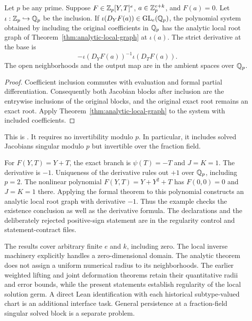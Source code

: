 \begin{corollary}
\label{cor:integral-analytic-graph}
Let $p$ be any prime. Suppose $F\in\mathbb Z_p[Y,T]^e$, $a\in\mathbb Z_p^{e+k}$,
and $F(a)=0$. Let $\iota:\mathbb Z_p\hookrightarrow\mathbb Q_p$ be the inclusion.
If $\iota(D_YF(a))\in\operatorname{GL}_e(\mathbb Q_p)$, the polynomial system
obtained by including the original coefficients in $\mathbb Q_p$ has the analytic
local root graph of Theorem~\ref{thm:analytic-local-graph} at $\iota(a)$.
The strict derivative at the base is
\[
 -\iota(D_YF(a))^{-1}\iota(D_TF(a)).
\]
The open neighborhoods and the output map are in the ambient spaces over
$\mathbb Q_p$.
\end{corollary}
\begin{proof}
Coefficient inclusion commutes with evaluation and formal partial
differentiation. Consequently both Jacobian blocks after inclusion are the
entrywise inclusions of the original blocks, and the original exact root
remains an exact root. Apply Theorem~\ref{thm:analytic-local-graph} to the system with included
coefficients.
\end{proof}
This is
.
It requires no invertibility modulo $p$. In particular, it includes solved
Jacobians singular modulo $p$ but invertible over the fraction field.

\begin{example}
For $F(Y,T)=Y+T$, the exact branch is $\psi(T)=-T$ and $J=K=1$.
The derivative is $-1$. Uniqueness of the derivative rules out $+1$ over
$\mathbb Q_p$, including $p=2$. The nonlinear polynomial $F(Y,T)=Y+Y^2+T$
has $F(0,0)=0$ and $J=K=1$ there. Applying the formal theorem to this polynomial constructs an analytic
local root graph with derivative $-1$. Thus the example checks the existence
conclusion as well as the derivative formula.
The declarations and the deliberately rejected positive-sign statement are
in the regularity control and statement-contract files.
\end{example}

The results cover arbitrary finite $e$ and $k$, including zero. The local
inverse machinery explicitly handles a zero-dimensional domain. The analytic theorem does not assign a uniform numerical radius to its
neighborhoods. The earlier
weighted lifting and joint deformation theorems retain their quantitative
radii and error bounds, while the present statements establish regularity
of the local solution germ. A direct Lean identification with each
historical subtype-valued chart is an additional interface task. General
persistence at a fraction-field singular solved block is a separate problem.

